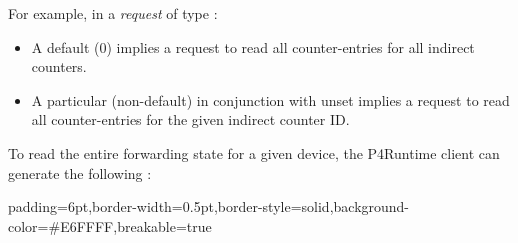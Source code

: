 \documentclass[11pt]{article}
\begin{document}
{%
For example, in a \emph{request} of type :%

\begin{itemize}[noitemsep,topsep=\mdcompacttopsep]%

\item{}A default  (0) implies a request to read all counter-entries for
all indirect counters.%

\item{}A particular (non-default)  in conjunction with  unset
implies a request to read all counter-entries for the given indirect counter
ID.%
\end{itemize}%

\noindent{}To read the entire forwarding state for a given device, the P4Runtime client can
generate the following :%

\begin{mdbmargintb}{6pt}{6pt}%
\begin{mdblock}{padding=6pt,border-width=0.5pt,border-style=solid,background-color=\#E6FFFF,breakable=true}%
\begin{mdpre}%
\end{mdpre}%
\end{mdblock}%
\end{mdbmargintb}%

}
\end{document}
